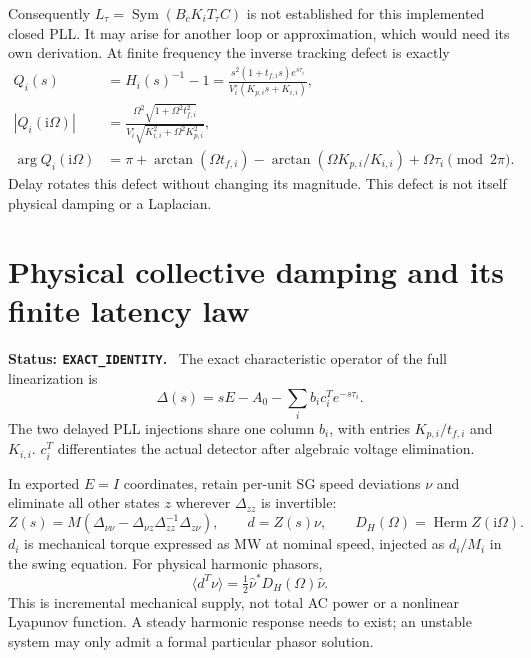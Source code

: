 \documentclass[11pt]{article}
\newcommand{\Herm}{\operatorname{Herm}}
\newcommand{\ii}{\mathrm{i}}
\newcommand{\status}[1]{\par\smallskip\noindent\textbf{Status: \texttt{#1}.}\ }
\begin{document}
Consequently $L_\tau=\operatorname{Sym}(B_cK_iT_\tau C)$ is not established
for this implemented closed PLL. It may arise for another loop or
approximation, which would need its own derivation.
At finite frequency the inverse tracking defect is exactly
\begin{align}
 Q_i(s)&=H_i(s)^{-1}-1
 =\frac{s^2(1+t_{f,i}s)e^{s\tau_i}}{V_i^\circ(K_{p,i}s+K_{i,i})},\\
 |Q_i(\ii\Omega)|&=
 \frac{\Omega^2\sqrt{1+\Omega^2t_{f,i}^2}}
 {V_i^\circ\sqrt{K_{i,i}^2+\Omega^2K_{p,i}^2}},\\
 \arg Q_i(\ii\Omega)&=\pi+\arctan(\Omega t_{f,i})
 -\arctan(\Omega K_{p,i}/K_{i,i})+\Omega\tau_i\pmod{2\pi}.
\end{align}
Delay rotates this defect without changing its magnitude. This defect
is not itself physical damping or a Laplacian.

\section{Physical collective damping and its finite latency law}\label{app:physical}
\status{EXACT\_IDENTITY}
The exact characteristic operator of the full linearization is
\[
 \Delta(s)=sE-A_0-\sum_i b_ic_i^T e^{-s\tau_i}.
\]
The two delayed PLL injections share one column $b_i$, with entries
$K_{p,i}/t_{f,i}$ and $K_{i,i}$. $c_i^T$ differentiates the actual
detector after algebraic voltage elimination.

In exported $E=I$ coordinates, retain per-unit SG speed deviations $\nu$
and eliminate all other states $z$ wherever $\Delta_{zz}$ is invertible:
\begin{equation}
 Z(s)=M(\Delta_{\nu\nu}-\Delta_{\nu z}\Delta_{zz}^{-1}\Delta_{z\nu}),
 \qquad d=Z(s)\nu,\qquad D_H(\Omega)=\Herm Z(\ii\Omega). \label{eq:Z}
\end{equation}
$d_i$ is mechanical torque expressed as MW at nominal speed, injected
as $d_i/M_i$ in the swing equation. For physical harmonic phasors,
\[
 \langle d^T\nu\rangle=\tfrac12\widehat\nu^*D_H(\Omega)\widehat\nu .
\]
This is incremental mechanical supply, not total AC power or a nonlinear
Lyapunov function. A steady harmonic response needs to exist; an unstable
system may only admit a formal particular phasor solution.
\end{document}
